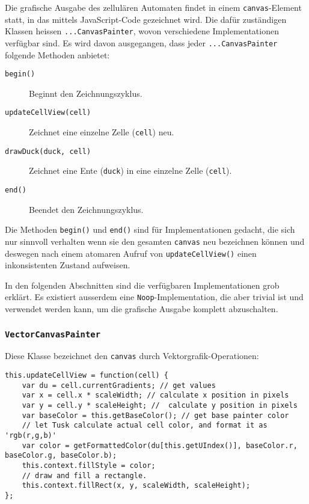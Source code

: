 \documentclass[11pt]{article} %
\theoremstyle{definition}
\begin{document}
Die grafische Ausgabe des zellulären Automaten findet in einem {\tt canvas}-Element statt, in das mittels JavaScript-Code gezeichnet wird. Die dafür zuständigen Klassen heissen {\tt ...CanvasPainter}, wovon verschiedene Implementationen verfügbar sind. Es wird davon ausgegangen, dass jeder {\tt ...CanvasPainter} folgende Methoden anbietet:

\begin{description}
\item[\tt begin()] Beginnt den Zeichnungszyklus.
\item[\tt updateCellView(cell)] Zeichnet eine einzelne Zelle ({\tt cell}) neu.
\item[\tt drawDuck(duck, cell)] Zeichnet eine Ente ({\tt duck}) in eine einzelne Zelle ({\tt cell}).
\item[\tt end()] Beendet den Zeichnungszyklus.
\end{description}

Die Methoden {\tt begin()} und {\tt end()} sind für Implementationen gedacht, die sich nur sinnvoll verhalten wenn sie den gesamten {\tt canvas} neu bezeichnen können und deswegen nach einem atomaren Aufruf von {\tt updateCellView()} einen inkonsistenten Zustand aufweisen.

In den folgenden Abschnitten sind die verfügbaren Implementationen grob erklärt. Es existiert ausserdem eine {\tt Noop}-Implementation, die aber trivial ist und verwendet werden kann, um die grafische Ausgabe komplett abzuschalten.

\subsubsection{{\tt VectorCanvasPainter}}

Diese Klasse bezeichnet den {\tt canvas} durch Vektorgrafik-Operationen:

\begin{lstlisting}
this.updateCellView = function(cell) {
	var du = cell.currentGradients; // get values
	var x = cell.x * scaleWidth; // calculate x position in pixels
	var y = cell.y * scaleHeight; //  calculate y position in pixels
	var baseColor = this.getBaseColor(); // get base painter color
	// let Tusk calculate actual cell color, and format it as 'rgb(r,g,b)'
	var color = getFormattedColor(du[this.getUIndex()], baseColor.r, baseColor.g, baseColor.b);
	this.context.fillStyle = color;
	// draw and fill a rectangle.
	this.context.fillRect(x, y, scaleWidth, scaleHeight);
};
\end{lstlisting}
\end{document}
